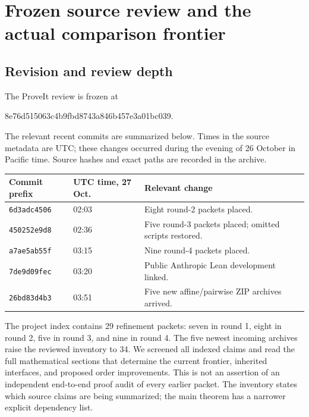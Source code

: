 \section{Frozen source review and the actual comparison frontier}
\label{sec:review}

\subsection{Revision and review depth}

\begin{samepage}
The ProveIt review is frozen at
\begin{center}\small\ttfamily
8e76d515063c4b9fbd8743a846b457e3a01bc039.
\end{center}
\end{samepage}
The relevant recent commits are summarized below. Times in the source
metadata are UTC; these changes occurred during the evening of 26 October
in Pacific time. Source hashes and exact paths are recorded in the archive.

\begin{center}\small
\begin{tabular}{@{}llp{8.3cm}@{}}
\toprule Commit prefix & UTC time, 27 Oct. & Relevant change\\
\midrule
\texttt{6d3adc4506}&02:03&Eight round-2 packets placed.\\
\texttt{450252e9d8}&02:36&Five round-3 packets placed; omitted scripts restored.\\
\texttt{a7ae5ab55f}&03:15&Nine round-4 packets placed.\\
\texttt{7de9d09fec}&03:20&Public Anthropic Lean development linked.\\
\texttt{26bd83d4b3}&03:51&Five new affine/pairwise ZIP archives arrived.\\
\bottomrule
\end{tabular}
\end{center}

The project index contains 29 refinement packets: seven in round 1, eight
in round 2, five in round 3, and nine in round 4. The five newest incoming
archives raise the reviewed inventory to 34. We screened all indexed
claims and read the full mathematical sections that determine the current
frontier, inherited interfaces, and proposed order improvements. This is
not an assertion of an independent end-to-end proof audit of every earlier
packet. The inventory states which source claims are being summarized;
the main theorem has a narrower explicit dependency list.


